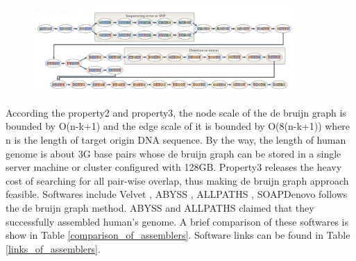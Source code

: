 \documentclass{article}
\begin{document}
\begin{figure}[ht]
  \centering
  \includegraphics[width=10cm]{Figure6.jpg}\\
  \caption{}\label{debruijn_graph_example}
\end{figure}
According the property2 and property3, the node scale of the de bruijn graph is bounded by O(n-k+1) and the edge scale of it is bounded by O(8(n-k+1)) where n is the length of target origin DNA sequence. By the way, the length of human genome is about 3G base pairs whose de bruijn graph can be stored in a single server machine or cluster configured with 128GB. Property3 releases the heavy cost of searching for all pair-wise overlap, thus making de bruijn graph approach feasible. Softwares include Velvet \cite{zerbino2008velvet}, ABYSS \cite{simpson2009abyss}, ALLPATHS \cite{butler2008allpaths}, SOAPDenovo \cite{li2010novo} follows the de bruijn graph method. ABYSS and ALLPATHS claimed that they successfully assembled human's genome. A brief comparison of these softwares is show in Table \ref{comparison_of_assemblers}. Software links can be found in Table \ref{links_of_assemblers}.\\
\end{document}
